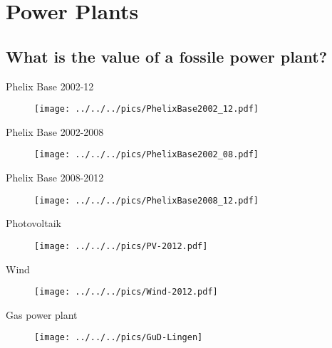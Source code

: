 \section{Power Plants}
\subsection{What is the value of a fossile power plant?}

{Phelix Base 2002-12}
\begin{figure}[htp]
\centering
\texttt{[image: ../../../pics/PhelixBase2002\_12.pdf]}
\end{figure}



{Phelix Base 2002-2008}
\begin{figure}[htp]
\centering
\texttt{[image: ../../../pics/PhelixBase2002\_08.pdf]}

\end{figure}




{Phelix Base 2008-2012}
\begin{figure}[htp]
\centering
\texttt{[image: ../../../pics/PhelixBase2008\_12.pdf]}

\end{figure}



{Photovoltaik}
\begin{figure}[htp]
\centering
\texttt{[image: ../../../pics/PV-2012.pdf]}
\label{prices}
\end{figure}



{Wind}
\begin{figure}[htp]
\centering
\texttt{[image: ../../../pics/Wind-2012.pdf]}
\label{prices}
\end{figure}



{Gas power plant}
\begin{figure}[htp]
\centering
\texttt{[image: ../../../pics/GuD-Lingen]}
\label{prices}
\end{figure}



